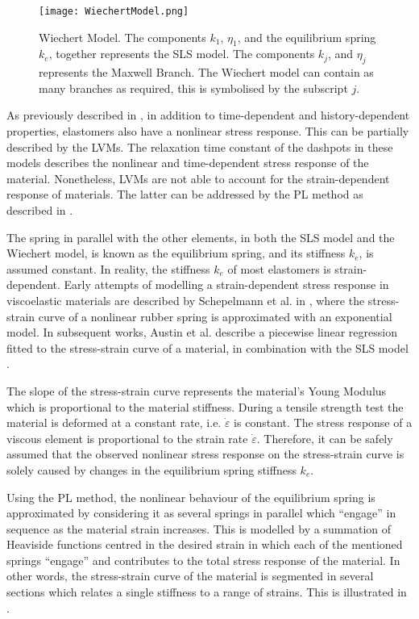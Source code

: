 \begin{figure}[hbt!]
	\centering
    \texttt{[image: WiechertModel.png]}
    \caption{Wiechert Model. The components $k_1$, $\eta_1$, and the equilibrium spring $k_e$, together represents the SLS model. The components $k_j$, and $\eta_j$ represents the Maxwell Branch. The Wiechert model can contain as many branches as required, this is symbolised by the subscript $j$. }
    \label{fig:wiechert}
\end{figure}

As previously described in , in addition to time-dependent and history-dependent properties, elastomers also have a nonlinear stress response. This can be partially described by the LVMs. The relaxation time constant of the dashpots in these models describes the nonlinear and time-dependent stress response of the material. Nonetheless, LVMs are not able to account for the strain-dependent response of materials. The latter can be addressed by the PL method as described in \cite{austin2015control}.

The spring in parallel with the other elements, in both the SLS model and the Wiechert model, is known as the equilibrium spring, and its stiffness $k_e$, is assumed constant. In reality, the stiffness $k_e$ of most elastomers is strain-dependent. Early attempts of modelling a strain-dependent stress response in viscoelastic materials are described by Schepelmann et al. in \cite{schepelmann2014compact}, where the stress-strain curve of a nonlinear rubber spring is approximated with an exponential model. In subsequent works, Austin et al. describe a piecewise linear regression fitted to the stress-strain curve of a material, in combination with the SLS model \cite{austin2015control}. 

The slope of the stress-strain curve represents the material's Young Modulus which is proportional to the material stiffness. During a tensile strength test the material is deformed at a constant rate, i.e. $\dot{\varepsilon}$ is constant. The stress response of a viscous element is proportional to the strain rate $\dot{\varepsilon}$. Therefore, it can be safely assumed that the observed nonlinear stress response on the stress-strain curve is solely caused by changes in the equilibrium spring stiffness $k_e$.

Using the PL method, the nonlinear behaviour of the equilibrium spring is approximated by considering it as several springs in parallel which ``engage'' in sequence as the material strain increases. This is modelled by a summation of Heaviside functions centred in the desired strain in which each of the mentioned springs ``engage'' and contributes to the total stress response of the material. In other words, the stress-strain curve of the material is segmented in several sections which relates a single stiffness to a range of strains. This is illustrated in .

